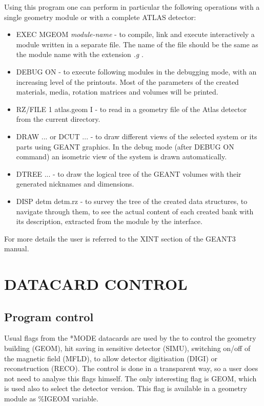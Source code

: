 Using this program  one can perform in particular the following
operations  with a single geometry module or with a complete
ATLAS detector:

\begin{itemize}
\item
EXEC MGEOM {\it module-name} - 
to compile, link and execute
interactively a module written in a separate file.
The name of the file should be the same as the module name
with the extension {\it .g} .     
\item
DEBUG ON - 
to execute following  modules in the debugging mode, 
with an increasing level of the \as printouts.
Most of the parameters of the created materials,
media, rotation matrices and volumes  will be printed.
\item
RZ/FILE 1 atlas.geom I -
to read in a geometry file of the Atlas detector from
the current directory.
\item
DRAW ... or DCUT ...  - to draw different views 
of the selected system or its parts using GEANT graphics.
In the debug mode (after DEBUG ON command) an isometric
view of the system is drawn automatically.
\item
DTREE ... - 
to draw the logical tree of the GEANT volumes 
with their generated nicknames and dimensions.
\item 
DISP detm detm.rz - 
to survey the tree  of  the created data structures, 
to navigate through them, to see the actual content
of each created bank with its description, 
extracted from the module by the \as interface.
\end{itemize}
For more details the user is referred to
 the XINT section of the GEANT3 manual.

\section{DATACARD CONTROL}

\subsection{Program control}

Usual flags from the *MODE datacards are used by the \asi
to control the geometry building (GEOM), hit saving 
in sensitive detector (SIMU), switching on/off of the magnetic
field (MFLD), to allow detector digitisation (DIGI)
or reconstruction (RECO). 
The control is done in a transparent way, 
so a user does not need to analyse this flags himself.
The only interesting flag is GEOM, which is used also
to select the detector version. This flag is available 
in a geometry module as \%IGEOM variable.

